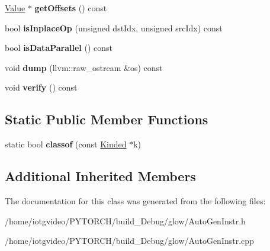 \begin{DoxyCompactItemize}
\hyperlink{classglow_1_1_value}{Value} $\ast$ {\bfseries get\+Offsets} () const
\item 
\mbox{\label{classglow_1_1_rowwise_quantized_fully_connected_inst_a253e2ed4bf79b462952ad7784a50e28b}} 
bool {\bfseries is\+Inplace\+Op} (unsigned dst\+Idx, unsigned src\+Idx) const
\item 
\mbox{\label{classglow_1_1_rowwise_quantized_fully_connected_inst_a3c9f0398b4277984c533890e26c7a1f6}} 
bool {\bfseries is\+Data\+Parallel} () const
\item 
\mbox{\label{classglow_1_1_rowwise_quantized_fully_connected_inst_ae0c0bfa0f8423b979f3638d7f8b16f7f}} 
void {\bfseries dump} (llvm\+::raw\+\_\+ostream \&os) const
\item 
\mbox{\label{classglow_1_1_rowwise_quantized_fully_connected_inst_aa22b53ee08cbee1d35d1411942cdf57a}} 
void {\bfseries verify} () const
\end{DoxyCompactItemize}
\subsection*{Static Public Member Functions}
\begin{DoxyCompactItemize}
\item 
\mbox{\label{classglow_1_1_rowwise_quantized_fully_connected_inst_a87d5ad9fbad39e67b6a222d8437c0fbf}} 
static bool {\bfseries classof} (const \hyperlink{classglow_1_1_kinded}{Kinded} $\ast$k)
\end{DoxyCompactItemize}
\subsection*{Additional Inherited Members}


The documentation for this class was generated from the following files\+:\begin{DoxyCompactItemize}
\item 
/home/iotgvideo/\+P\+Y\+T\+O\+R\+C\+H/build\+\_\+\+Debug/glow/Auto\+Gen\+Instr.\+h\item 
/home/iotgvideo/\+P\+Y\+T\+O\+R\+C\+H/build\+\_\+\+Debug/glow/Auto\+Gen\+Instr.\+cpp\end{DoxyCompactItemize}

